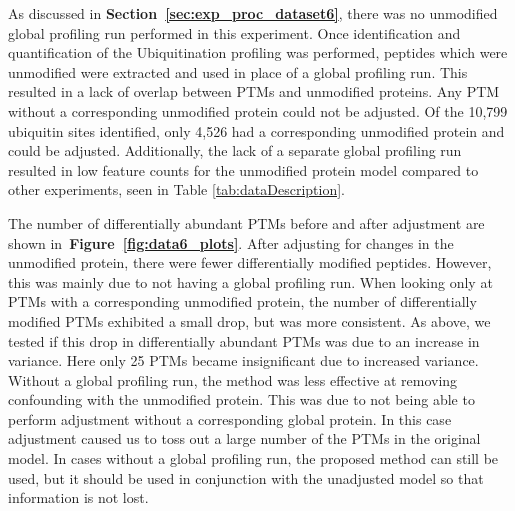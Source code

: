 \documentclass[mcp]{article}
\numberwithin{table}{section}
\def\figref#1{{\bf Figure~\ref{fig:#1}}}
\def\secref#1{{\bf Section~\ref{sec:#1}}}
\begin{document}
As discussed in \secref{exp_proc_dataset6}, there was no unmodified global profiling run performed in this experiment. Once identification and quantification of the Ubiquitination profiling was performed, peptides which were unmodified were extracted and used in place of a global profiling run. This resulted in a lack of overlap between PTMs and unmodified proteins. Any PTM without a corresponding unmodified protein could not be adjusted. Of the 10,799 ubiquitin sites identified, only 4,526 had a corresponding unmodified protein and could be adjusted. Additionally, the lack of a separate global profiling run resulted in low feature counts for the unmodified protein model compared to other experiments, seen in Table \ref{tab:dataDescription}.

The number of differentially abundant PTMs before and after adjustment are shown in~\figref{data6_plots}. After adjusting for changes in the unmodified protein, there were fewer differentially modified peptides. However, this was mainly due to not having a global profiling run. When looking only at PTMs with a corresponding unmodified protein, the number of differentially modified PTMs exhibited a small drop, but was more consistent. As above, we tested if this drop in differentially abundant PTMs was due to an increase in variance. Here only 25 PTMs became insignificant due to increased variance. Without a global profiling run, the method was less effective at removing confounding with the unmodified protein. This was due to not being able to perform adjustment without a corresponding global protein. In this case adjustment caused us to toss out a large number of the PTMs in the original model. In cases without a global profiling run, the proposed method can still be used, but it should be used in conjunction with the unadjusted model so that information is not lost.

\end{document}
